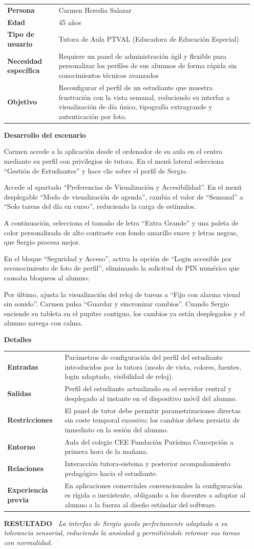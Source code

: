\documentclass[11pt,a4paper]{article}
\makeatletter
\newcommand{\escenariocard}[6]{%
\needspace{10\baselineskip}
\begin{tcolorbox}[breakable,enhanced,colback=white,colframe=brandgreen,boxrule=0.8pt,arc=3pt,
  left=9pt,right=9pt,top=7pt,bottom=7pt,before skip=10pt,after skip=10pt,
  title={\textbf{\color{white}ESCENARIO #1} \\[1pt] {\small\color{tintgreen}#2}},
  colbacktitle=brandgreen,coltitle=white,fonttitle=\bfseries,boxed title style={colframe=brandgreen}]
{\setlength{\parskip}{0pt}\renewcommand{\arraystretch}{1.35}\rowcolors{1}{tintgreen}{white}\arrayrulecolor{white}
\begin{tabular}{@{\hspace{4pt}}>{\bfseries\color{brandgreen}}p{3.4cm}p{11.4cm}@{}}
#3 \\
\end{tabular}}
\vspace{6pt}
\textbf{\color{brandblue}Desarrollo del escenario}\par\vspace{2pt}
#4
\par\vspace{4pt}
\textbf{\color{brandblue}Detalles}\par\vspace{2pt}
{\setlength{\parskip}{0pt}\renewcommand{\arraystretch}{1.35}\rowcolors{1}{tintblue}{white}\arrayrulecolor{white}
\begin{tabular}{@{\hspace{4pt}}>{\bfseries\color{brandblue}}p{3.4cm}p{11.4cm}@{}}
#5 \\
\end{tabular}}
\vspace{6pt}
\begin{tcolorbox}[colback=tintblue,colframe=brandblue,boxrule=0pt,sharp corners,borderline west={3pt}{0pt}{brandblue},left=8pt,right=8pt,top=5pt,bottom=5pt]
\textbf{\small\color{brandblue}RESULTADO\ } {\small\itshape #6}
\end{tcolorbox}
\end{tcolorbox}
}
\makeatother
\begin{document}
\escenariocard{7}{Ajuste del perfil y simplificación de la interfaz ante sobrecarga cognitiva}{%
Persona & Carmen Heredia Salazar \\
Edad & 45 años \\
Tipo de usuario & Tutora de Aula PTVAL (Educadora de Educación Especial) \\
Necesidad específica & Requiere un panel de administración ágil y flexible para personalizar los perfiles de sus alumnos de forma rápida sin conocimientos técnicos avanzados \\
Objetivo & Reconfigurar el perfil de un estudiante que muestra frustración con la vista semanal, reduciendo su interfaz a visualización de día único, tipografía extragrande y autenticación por foto.
}{%
Carmen accede a la aplicación desde el ordenador de su aula en el centro mediante su perfil con privilegios de tutora. En el menú lateral selecciona ``Gestión de Estudiantes'' y hace clic sobre el perfil de Sergio.

Accede al apartado ``Preferencias de Visualización y Accesibilidad''. En el menú desplegable ``Modo de visualización de agenda'', cambia el valor de ``Semanal'' a ``Solo tareas del día en curso'', reduciendo la carga de estímulos.

A continuación, selecciona el tamaño de letra ``Extra Grande'' y una paleta de color personalizada de alto contraste con fondo amarillo suave y letras negras, que Sergio procesa mejor.

En el bloque ``Seguridad y Acceso'', activa la opción de ``Login accesible por reconocimiento de foto de perfil'', eliminando la solicitud de PIN numérico que causaba bloqueos al alumno.

Por último, ajusta la visualización del reloj de tareas a ``Fijo con alarma visual sin sonido''. Carmen pulsa ``Guardar y sincronizar cambios''. Cuando Sergio enciende su tableta en el pupitre contiguo, los cambios ya están desplegados y el alumno navega con calma.
}{%
Entradas & Parámetros de configuración del perfil del estudiante introducidos por la tutora (modo de vista, colores, fuentes, login adaptado, visibilidad de reloj). \\
Salidas & Perfil del estudiante actualizado en el servidor central y desplegado al instante en el dispositivo móvil del alumno. \\
Restricciones & El panel de tutor debe permitir parametrizaciones directas sin coste temporal excesivo; los cambios deben persistir de inmediato en la sesión del alumno. \\
Entorno & Aula del colegio CEE Fundación Purísima Concepción a primera hora de la mañana. \\
Relaciones & Interacción tutora-sistema y posterior acompañamiento pedagógico hacia el estudiante. \\
Experiencia previa & En aplicaciones comerciales convencionales la configuración es rígida o inexistente, obligando a los docentes a adaptar al alumno a la fuerza al diseño estándar del software.
}{La interfaz de Sergio queda perfectamente adaptada a su tolerancia sensorial, reduciendo la ansiedad y permitiéndole retomar sus tareas con normalidad.}
\end{document}
